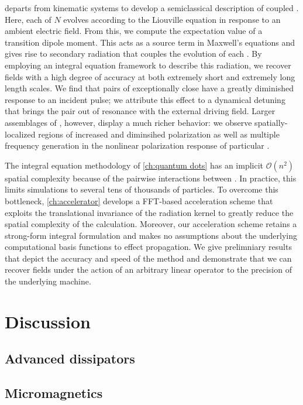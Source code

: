  departs from kinematic systems to develop a semiclassical description of coupled \qds{}.
Here, each of $N$ \qds{} evolves according to the Liouville equation in response to an ambient electric field.
From this, we compute the expectation value of a transition dipole moment.
This acts as a source term in Maxwell's equations and gives rise to secondary radiation that couples the evolution of each \qd{}.
By employing an integral equation framework to describe this radiation, we recover fields with a high degree of accuracy at both extremely short and extremely long length scales.
We find that pairs of exceptionally close \qds{} have a greatly diminished response to an incident pulse; we attribute this effect to a dynamical detuning that brings the pair out of resonance with the external driving field. 
Larger assemblages of \qds{}, however, display a much richer behavior: we observe spatially-localized regions of increased and diminsihed polarization as well as multiple frequency generation in the nonlinear polarization response of particular \qds{}.

The integral equation methodology of \cref{ch:quantum dots} has an implicit $\mathcal{O}(n^2)$ spatial complexity because of the pairwise interactions between \qds{}.
In practice, this limits simulations to several tens of thousands of particles.
To overcome this bottleneck, \cref{ch:accelerator} develops a FFT-based acceleration scheme that exploits the translational invariance of the radiation kernel to greatly reduce the spatial complexity of the calculation.
Moreover, our acceleration scheme retains a strong-form integral formulation and makes no assumptions about the underlying computational basis functions to effect propagation.
We give prelimniary results that depict the accuracy and speed of the method and demonstrate that we can recover fields under the action of an arbitrary linear operator to the precision of the underlying machine.

\section{Discussion}

\subsection{Advanced dissipators}

\subsection{Micromagnetics}

